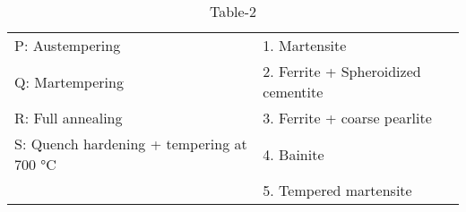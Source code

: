 
\begin{table}[htbp]
\caption{Table-2}
\label{tab:tables/table2.tex}
\begin{tabular}{l l}
P: Austempering & 1. Martensite \\
Q: Martempering & 2. Ferrite + Spheroidized cementite \\
R: Full annealing & 3. Ferrite + coarse pearlite \\
S: Quench hardening + tempering at 700 °C & 4. Bainite \\
& 5. Tempered martensite \\
\end{tabular}
\end{table}